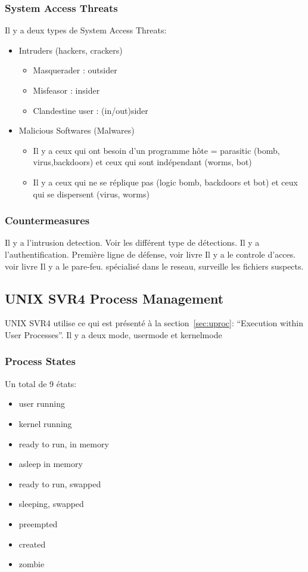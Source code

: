\subsubsection{System Access Threats}
Il y a deux types de System Access Threats:
\begin{itemize}
  \item Intruders (hackers, crackers)
    \begin{itemize}
      \item Masquerader : outsider
      \item Misfeasor : insider
      \item Clandestine user : (in/out)sider
    \end{itemize}
  \item Malicious Softwares (Malwares)
    \begin{itemize}
      \item Il y a ceux qui ont besoin d'un programme hôte = parasitic (bomb, virus,backdoors) et ceux qui sont indépendant (worms, bot)
      \item Il y a ceux qui ne se réplique pas (logic bomb, backdoors et bot) et ceux qui se dispersent (virus, worms)
    \end{itemize}
\end{itemize}

\subsubsection{Countermeasures}
Il y a l'intrusion detection. Voir \cite[p.~165]{stallings} les différent type de détections.
Il y a l'authentification. Première ligne de défense, voir livre Il y a le controle d'acces. voir livre Il y a le pare-feu. spécialisé dans le reseau, surveille les fichiers suspects.

\subsection{UNIX SVR4 Process Management}
UNIX SVR4 utilise ce qui est présenté à la section~\ref{sec:uproc}:
``Execution within User Processes''.
Il y a deux mode, usermode et kernelmode

\subsubsection{Process States}
Un total de 9 états:
\begin{itemize}
  \item user running
  \item kernel running
  \item ready to run, in memory
  \item asleep in memory
  \item ready to run, swapped
  \item sleeping, swapped
  \item preempted
  \item created
  \item zombie
\end{itemize}

